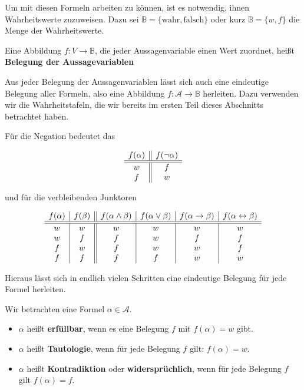Um mit diesen Formeln arbeiten zu können, ist es notwendig, ihnen Wahrheitswerte zuzuweisen. Dazu sei 
$\mathbb B  = \{ \textrm{wahr}, \textrm{falsch} \}$ oder kurz $\mathbb B = \{w, f\}$ die Menge der 
Wahrheitswerte. 

\begin{definition} Eine Abbildung $f: V \longrightarrow \mathbb B$, die jeder Aussagenvariable einen Wert 
zuordnet, heißt \textbf{Belegung der Aussagevariablen} 
\end{definition}

Aus jeder Belegung der Aussagenvariablen lässt sich auch eine eindeutige Belegung aller Formeln, also eine 
Abbildung $f: \mathcal{A} \longrightarrow \mathbb B$ herleiten. Dazu verwenden wir die Wahrheitstafeln, die
wir bereits im ersten Teil dieses Abschnitts betrachtet haben.

Für die Negation bedeutet das

\medskip

	$$ \begin{array}{ c | | c }
	f(\alpha)  &  f(\neg \alpha) \\
	\hline \hline
	w &  f \\
	f &  w \\
	\end{array} $$

und für die verbleibenden Junktoren


	$$ \begin{array}{ c | c || c | c | c | c }
 	f(\alpha) & f(\beta) & f(\alpha \wedge \beta) & f(\alpha \vee \beta) & 
	f(\alpha \rightarrow \beta) & f(\alpha \leftrightarrow \beta) \\
	\hline \hline
	w & w & w & w & w & w \\
	w & f & f & w & f & f \\
	f & w & f & w & w & f \\
	f & f & f & f & w & w
	\end{array}  $$
 
Hieraus lässt sich in endlich vielen Schritten eine eindeutige Belegung für jede Formel herleiten.

\begin{definition} Wir betrachten eine Formel $\alpha \in \mathcal{A}$.

\begin{itemize}
\item $\alpha$ heißt \textbf{erfüllbar}, wenn es eine Belegung $f$ mit $f(\alpha) = w$ gibt.
\item $\alpha$ heißt \textbf{Tautologie}, wenn für jede Belegung $f$ gilt: $f(\alpha) = w$.
\item $\alpha$ heißt \textbf{Kontradiktion} oder \textbf{widersprüchlich}, wenn für jede 
Belegung $f$ gilt $f(\alpha) = f$.
\end{itemize}
\end{definition}

